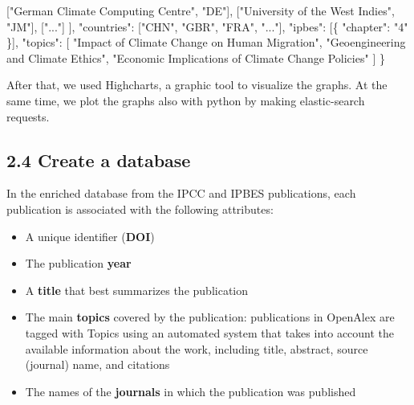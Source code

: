 \documentclass[
]{article}
\newenvironment{Shaded}{}{}
\newcommand{\DataTypeTok}[1]{\textcolor[rgb]{0.56,0.13,0.00}{#1}}
\newcommand{\FunctionTok}[1]{\textcolor[rgb]{0.02,0.16,0.49}{#1}}
\newcommand{\OtherTok}[1]{\textcolor[rgb]{0.00,0.44,0.13}{#1}}
\newcommand{\StringTok}[1]{\textcolor[rgb]{0.25,0.44,0.63}{#1}}
\providecommand{\tightlist}{%
  \setlength{\itemsep}{0pt}\setlength{\parskip}{0pt}}
\begin{document}
\begin{Shaded}
\begin{Highlighting}[]
    \OtherTok{[}\StringTok{"German Climate Computing Centre"}\OtherTok{,} \StringTok{"DE"}\OtherTok{],}
    \OtherTok{[}\StringTok{"University of the West Indies"}\OtherTok{,} \StringTok{"JM"}\OtherTok{],}
    \OtherTok{[}\StringTok{"..."}\OtherTok{]}
  \OtherTok{]}\FunctionTok{,}
  \DataTypeTok{"countries"}\FunctionTok{:} \OtherTok{[}\StringTok{"CHN"}\OtherTok{,} \StringTok{"GBR"}\OtherTok{,} \StringTok{"FRA"}\OtherTok{,} \StringTok{"..."}\OtherTok{]}\FunctionTok{,}
  \DataTypeTok{"ipbes"}\FunctionTok{:} \OtherTok{[}\FunctionTok{\{} \DataTypeTok{"chapter"}\FunctionTok{:} \StringTok{"4"} \FunctionTok{\}}\OtherTok{]}\FunctionTok{,}
  \DataTypeTok{"topics"}\FunctionTok{:} \OtherTok{[}
    \StringTok{"Impact of Climate Change on Human Migration"}\OtherTok{,}
    \StringTok{"Geoengineering and Climate Ethics"}\OtherTok{,}
    \StringTok{"Economic Implications of Climate Change Policies"}
  \OtherTok{]}
\FunctionTok{\}}
\end{Highlighting}
\end{Shaded}

After that, we used Highcharts, a graphic tool to visualize the graphs.
At the same time, we plot the graphs also with python by making
elastic-search requests.

\hypertarget{create-a-database}{%
\subsection{2.4 Create a database}\label{create-a-database}}

In the enriched database from the IPCC and IPBES publications, each
publication is associated with the following attributes:

\begin{itemize}
\tightlist
\item
  A unique identifier (\textbf{DOI})
\item
  The publication \textbf{year}
\item
  A \textbf{title} that best summarizes the publication
\item
  The main \textbf{topics} covered by the publication: publications in
  OpenAlex are tagged with Topics using an automated system that takes
  into account the available information about the work, including
  title, abstract, source (journal) name, and citations
\item
  The names of the \textbf{journals} in which the publication was
  published
\end{itemize}
\end{document}
